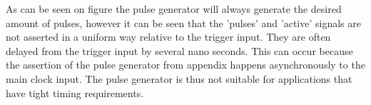 As can be seen on figure  the pulse generator will always generate the desired amount of pulses, however it can be seen that the 'pulses' and 'active' signals are not asserted in a uniform way relative to the trigger input. They are often delayed from the trigger input by several nano seconds. This can occur because the assertion of the pulse generator from appendix  happens asynchronously to the main clock input. The pulse generator is thus not suitable for applications that have tight timing requirements. 